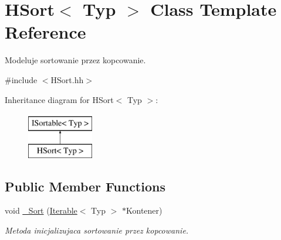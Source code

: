 \hypertarget{class_h_sort}{\section{H\-Sort$<$ Typ $>$ Class Template Reference}
\label{class_h_sort}
}


Modeluje sortowanie przez kopcowanie.  




{\ttfamily \#include $<$H\-Sort.\-hh$>$}

Inheritance diagram for H\-Sort$<$ Typ $>$\-:\begin{figure}[H]
\begin{center}
\leavevmode
\includegraphics[height=2.000000cm]{class_h_sort}
\end{center}
\end{figure}
\subsection*{Public Member Functions}
\begin{DoxyCompactItemize}
\item 
void \hyperlink{class_h_sort_a02c33b82d229214ebd19787b7c9ead2d}{\-\_\-\-Sort} (\hyperlink{class_iterable}{Iterable}$<$ Typ $>$ $\ast$Kontener)
\begin{DoxyCompactList}\small\item\em Metoda inicjalizujaca sortowanie przez kopcowanie. \end{DoxyCompactList}\end{DoxyCompactItemize}

